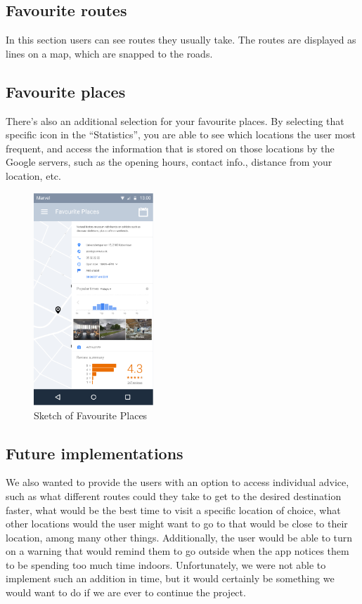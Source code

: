 \documentclass[12p]{article}
\begin{document}
	\subsection{Favourite routes}
	In this section users can see routes they usually take. The routes are displayed as lines on a map, which are snapped to the roads.
	
	\subsection{Favourite places}
    
	There’s also an additional selection for your favourite places. By selecting that specific icon in the “Statistics”, you are able to see which locations the user most frequent, and access the information that is stored on those locations by the Google servers, such as the opening hours, contact info., distance from your location, etc.

    \begin{figure}[ht]
	    \center
        \includegraphics[height=8cm,keepaspectratio]{pics/app_design/fav_places.PNG}
        \caption{Sketch of Favourite Places}
    \end{figure}
	
	\subsection{Future implementations}
	We also wanted to provide the users with an option to access individual advice, such as what different routes could they take to get to the desired destination faster, what would be the best time to visit a specific location of choice, what other locations would the user might want to go to that would be close to their location, among many other things. Additionally, the user would be able to turn on a warning that would remind them to go outside when the app notices them to be spending too much time indoors. Unfortunately, we were not able to implement such an addition in time, but it would certainly be something we would want to do if we are ever to continue the project.
\end{document}
